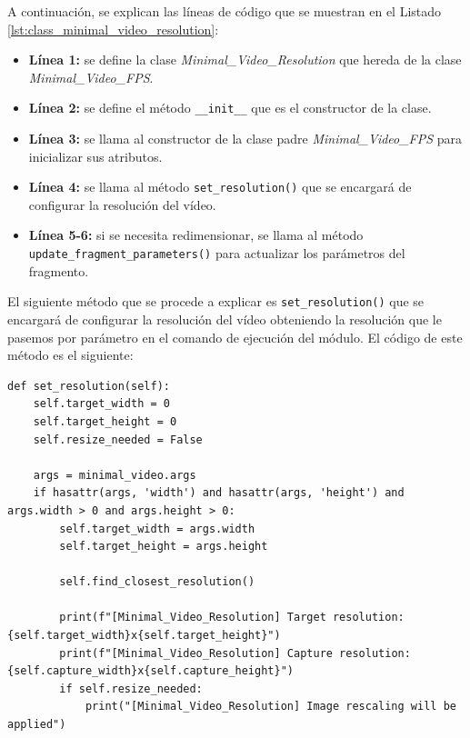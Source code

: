 A continuación, se explican las líneas de código que se muestran en el Listado \ref{lst:class_minimal_video_resolution}:
\begin{itemize}
    \item \textbf{Línea 1:} se define la clase \textit{Minimal\_Video\_Resolution} que hereda de la clase \textit{Minimal\_Video\_FPS}.
    \item \textbf{Línea 2:} se define el método \texttt{\_\_init\_\_} que es el constructor de la clase.
    \item \textbf{Línea 3:} se llama al constructor de la clase padre \textit{Minimal\_Video\_FPS} para inicializar sus atributos.
    \item \textbf{Línea 4:} se llama al método \texttt{set\_resolution()} que se encargará de configurar la resolución del vídeo.
    \item \textbf{Línea 5-6:} si se necesita redimensionar, se llama al método \texttt{update\_fragment\_parameters()} para actualizar los parámetros del fragmento.
\end{itemize}
\vspace{\baselineskip}

El siguiente método que se procede a explicar es \texttt{set\_resolution()} que se encargará de configurar la resolución del vídeo obteniendo la resolución que le pasemos por parámetro en el comando de ejecución del módulo. El código de este método es el siguiente:
\begin{lstlisting}[style=pythonstyle, caption={Método \texttt{set\_resolution()} de \textit{Minimal\_Video\_Resolution}.}, label={lst:set_resolution_minimal_video_resolution}]
def set_resolution(self):
    self.target_width = 0
    self.target_height = 0
    self.resize_needed = False

    args = minimal_video.args
    if hasattr(args, 'width') and hasattr(args, 'height') and args.width > 0 and args.height > 0:
        self.target_width = args.width
        self.target_height = args.height

        self.find_closest_resolution()

        print(f"[Minimal_Video_Resolution] Target resolution: {self.target_width}x{self.target_height}")
        print(f"[Minimal_Video_Resolution] Capture resolution: {self.capture_width}x{self.capture_height}")
        if self.resize_needed:
            print("[Minimal_Video_Resolution] Image rescaling will be applied")
\end{lstlisting}
\vspace{\baselineskip}

